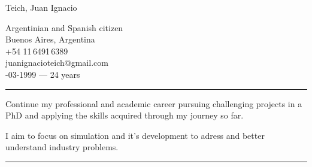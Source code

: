 \documentclass[a4paper,10pt]{article}
\newlength{\cvcolumngapwidth}
\newlength{\cvleftcolumnwidth}
\newlength{\cvrightcolumnwidth}
\newcommand{\cvnamestyle}[1]{{\Large\cvnamefont\textcolor{cvnamecolor}{#1}}}
\newcommand{\cvsectionstyle}[1]{{\normalsize\cvsectionfont\textcolor{cvsectioncolor}{#1}}}
\newcommand{\cvheadingstyle}[1]{{\normalsize\cvheadingfont\textcolor{cvheadingcolor}{#1}}}
\newlength{\cvafteritemskipamount}
\newlength{\cvaftersectionskipamount}
\newlength{\cvbetweensectionandheadingextraskipamount}
\newlength{\cvafternameskipamount}
\newlength{\cvafterpersonalinfolineskipamount}
\newlength{\cvparskip}
\newcommand{\cvpersonalinfo}[2]{
    \begin{minipage}[t]{\cvleftcolumnwidth}
        \vspace{0mm} %
        \raggedleft #1
    \end{minipage}%
    \hspace{\cvcolumngapwidth}%
    \begin{minipage}[t]{\cvrightcolumnwidth}
        \vspace{0mm} %
        #2
    \end{minipage}

    \vspace{\cvafteritemskipamount}
}
\newcommand{\cvname}[1]{
    \cvnamestyle{#1}

    \vspace{\cvafternameskipamount}
}
\newcommand{\cvpersonalinfolinewithicon}[3]{
    \raisebox{.5\fontcharht\font`E-.5\height}{\texttt{[image: \#2]}}
    #3

    \vspace{\cvafterpersonalinfolineskipamount}
}
\newcommand{\cvsection}[1]{
    \begin{minipage}[t]{\cvleftcolumnwidth}
        \raggedleft\cvsectionstyle{#1}
    \end{minipage}%
    \hspace{\cvcolumngapwidth}%
    \begin{minipage}[t]{\cvrightcolumnwidth}
        \textcolor{cvrulecolor}{\rule{\cvrightcolumnwidth}{0.3mm}}
    \end{minipage}

    \vspace{\cvaftersectionskipamount}
}
\newcommand{\cvitem}[2]{
    \begin{minipage}[t]{\cvleftcolumnwidth}
        \raggedleft #1
    \end{minipage}%
    \hspace{\cvcolumngapwidth}%
    \begin{minipage}[t]{\cvrightcolumnwidth}
        \setlength{\parskip}{\cvparskip} #2
    \end{minipage}

    \vspace{\cvafteritemskipamount}
}
\begin{document}

  \flushright
    \cvname{Teich, Juan Ignacio}

    \faFlag \quad Argentinian and Spanish citizen \\


    \faMapPin \quad Buenos Aires, Argentina \\

    \faPhone \quad +54 11\,6491\,6389 \\
  \faInbox \quad juanignacioteich@gmail.com \\


    \faCalendar  {}-03-1999  ---   24 years

\cvsection{PROFESSIONAL OBJECTIVES}

\vspace{\cvbetweensectionandheadingextraskipamount}
\cvitem{\cvheadingstyle{}}{
    Continue my professional and academic career pursuing challenging projects in a PhD and applying the skills acquired
    through my journey so far.

    I aim to focus on simulation and it's development to adress and better understand industry problems.
}



\cvsection{EDUCATION}
\end{document}
